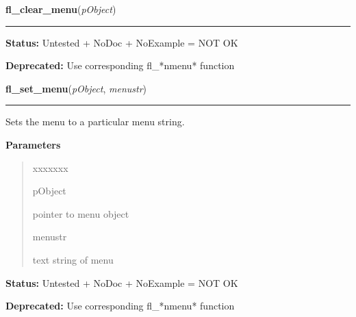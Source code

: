     \label{xformslib:deprecated:fl_clear_menu}

    \vspace{0.5ex}

\hspace{.8\funcindent}\begin{boxedminipage}{\funcwidth}

    \raggedright \textbf{fl\_clear\_menu}(\textit{pObject})

    \vspace{-1.5ex}

    \rule{\textwidth}{0.5\fboxrule}
\setlength{\parskip}{2ex}
\setlength{\parskip}{1ex}
\textbf{Status:} Untested + NoDoc + NoExample = NOT OK



\textbf{Deprecated:} Use corresponding fl\_*nmenu* function



    \end{boxedminipage}

    \label{xformslib:deprecated:fl_set_menu}

    \vspace{0.5ex}

\hspace{.8\funcindent}\begin{boxedminipage}{\funcwidth}

    \raggedright \textbf{fl\_set\_menu}(\textit{pObject}, \textit{menustr})

    \vspace{-1.5ex}

    \rule{\textwidth}{0.5\fboxrule}
\setlength{\parskip}{2ex}
    Sets the menu to a particular menu string.

\setlength{\parskip}{1ex}
      \textbf{Parameters}
      \vspace{-1ex}

      \begin{quote}
        \begin{Ventry}{xxxxxxx}

          \item[pObject]

          pointer to menu object

          \item[menustr]

          text string of menu

        \end{Ventry}

      \end{quote}

\textbf{Status:} Untested + NoDoc + NoExample = NOT OK



\textbf{Deprecated:} Use corresponding fl\_*nmenu* function



    \end{boxedminipage}

